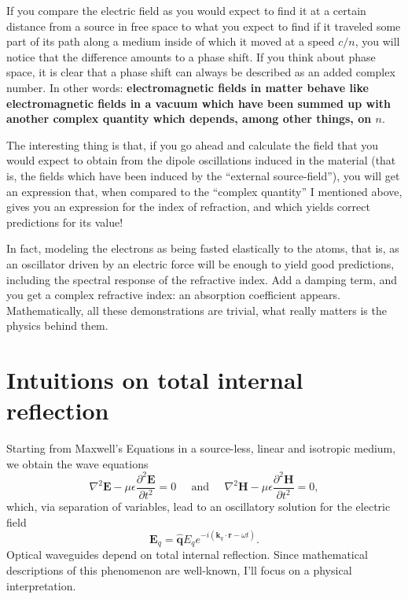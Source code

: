 If you compare the electric field as you would expect to find it at a certain distance from a source in free space to what you expect to find if it traveled some part of its path along a medium inside of which it moved at a speed $c/n$, you will notice that the difference amounts to a phase shift. If you think about phase space, it is clear that a phase shift can always be described as an added complex number. In other words: \textbf{electromagnetic fields in matter behave like electromagnetic fields in a vacuum which have been summed up with another complex quantity which depends, among other things, on $n$}. 

The interesting thing is that, if you go ahead and calculate the field that you would expect to obtain from the dipole oscillations induced in the material (that is, the fields which have been induced by the ``external source-field''), you will get an expression that, when compared to the ``complex quantity'' I mentioned above, gives you an expression for the index of refraction, and which yields correct predictions for its value!

In fact, modeling the electrons as being fasted elastically to the atoms, that is, as an oscillator driven by an electric force will be enough to yield good predictions, including the spectral response of the refractive index. Add a damping term, and you get a complex refractive index: an absorption coefficient appears. Mathematically, all these demonstrations are trivial, what really matters is the physics behind them.










\section{Intuitions on total internal reflection}


Starting from Maxwell's Equations in a source-less, linear and isotropic medium, we obtain the wave equations
\begin{equation}
    \nabla^2\textbf{E}-\mu\epsilon\frac{\partial^2\textbf{E}}{\partial t^2}=0\;\;\;\;\;\text{and}\;\;\;\;\;\nabla^2\textbf{H}-\mu\epsilon\frac{\partial^2\textbf{H}}{\partial t^2}=0,
\end{equation}
which, via separation of variables, lead to an oscillatory solution for the electric field
\begin{equation}
    \textbf{E}_q=\hat{\textbf{q}}E_qe^{-i(\textbf{k}_q\cdot\textbf{r}-\omega t)}.
\end{equation}
Optical waveguides depend on total internal reflection. Since mathematical descriptions of this phenomenon are well-known, I'll focus on a physical interpretation.

